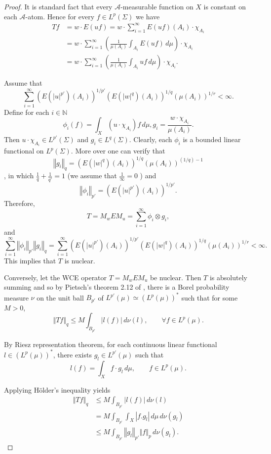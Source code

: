 \documentclass{amsart}
\theoremstyle{definition}\newtheorem{defn}[thm]{Definition}
\theoremstyle{remark}
\numberwithin{equation}{section}
\newcommand{\norm}[1]{\left\Vert#1\right\Vert}
\newcommand{\A}{\mathcal{A}}
\begin{document}
\begin{proof}
	 It is standard fact that every $\A$-measurable function on $X$ is constant on each $\A$-atom. Hence for every $f \in L^p(\Sigma)$ we have
	\begin{align*}
		T f &= w \cdot E(uf) = w \cdot \sum_{i=1}^{\infty} E(uf)(A_i) \cdot \chi_{A_i} \\
		&= w \cdot \sum_{i=1}^{\infty} \left( \frac{1}{\mu(A_i)} \int_{A_i} E(uf) \, d\mu \right) \cdot \chi_{A_i} \\
		&= w \cdot \sum_{i=1}^{\infty} \left( \frac{1}{\mu(A_i)} \int_{A_i} u f \, d\mu \right) \cdot \chi_{A_i}.	
	\end{align*}

	Assume that
	\[
	 \sum_{i=1}^{\infty} (E(|u|^{p'})(A_i))^{1/{p'}} (E(|w|^q)(A_i))^{1/q} (\mu(A_i))^{1/r} < \infty.
	\]
	Define for each $i \in \mathbb N$ 
	\[
	\phi_i(f) = \int_X (u \cdot \chi_{A_i}) f \, d\mu , g_i = \frac{w \cdot \chi_{A_i}}{\mu(A_i)}.
	\]
	Then $u \cdot \chi_{A_i} \in L^{p'}(\Sigma)$ and $g_i \in L^q(\Sigma)$. Clearly, each $\phi_i$ is a bounded linear functional on $L^p(\Sigma)$. More over one can verify that \[
	\norm{g_i}_q = (E(|w|^q)(A_i))^{1/q}(\mu(A_i))^{({1/q})-1}
	 \]
	, in which $\frac{1}{q} + \frac{1}{q'} = {1} $ (we assume that $\frac{1}{\infty} = {0} $ ) and \[
	\norm{\phi_i}_{p'} = (E(|u|^{p'})(A_i))^{1/{p'}}.
	\]
	 Therefore,
	\[
	T = M_w E M_u = \sum_{i=1}^{\infty} \phi_i \otimes g_i,
	\]
	and
	\[
	\sum_{i=1}^{\infty} \norm{\phi_i}_{p'} \norm{g_i}_{q} = \sum_{i=1}^{\infty} (E(|u|^{p'})(A_i))^{1/{p'}} (E(|w|^q)(A_i))^{1/q} (\mu(A_i))^{1/r} < \infty.
	\]
	This implies that $T$ is nuclear.
	
	Conversely, let the WCE operator $T = M_w E M_u$ be nuclear. Then $T$ is absolutely summing and so by Pietsch's theorem 2.12 of \cite{Diestel1995}, there is a Borel probability measure $\nu$ on the unit ball $B_{p'}$ of $L^{p'}(\mu) \simeq (L^p(\mu))^*$ such that for some $M > 0$,
	\[
	\norm{T f}_q \leq M \int_{B_{p'}} |l(f)| \, d\nu(l), \qquad \forall f \in L^p(\mu).
	\]
	
	By Riesz representation theorem, for each continuous linear functional $l \in (L^p(\mu))^*$, there exists $g_l \in L^{p'}(\mu)$ such that
	\[
	l(f) = \int_X f \cdot g_l \, d\mu, \qquad f \in L^p(\mu).
	\]
	
	Applying Hölder's inequality yields
	\begin{align*}
		\norm{T f}_q &\leq M \int_{B_{p'}} |l(f)| \, d\nu(l) \\
		&= M \int_{B_{p'}} \int_X |f . g_l| \, d\mu \, d\nu(g_l) \\
		&\leq M \int_{B_{p'}} \norm{g_l}_{p'} \norm{f}_p \, d\nu(g_l).
	\end{align*}
	

\end{proof}
\end{document}
